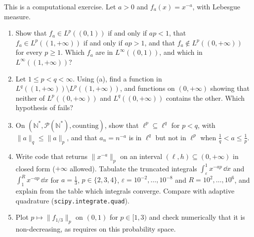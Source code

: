 \begin{exercise}\label{ex:ld-powers}
\medium This is a computational exercise. Let $a>0$ and $f_a(x)=x^{-a}$, with Lebesgue measure.
\begin{enumerate}[label=(\alph*)]
  \item Show that $f_a\in L^p((0,1))$ if and only if $ap<1$, that $f_a\in L^p((1,+\infty))$ if and
    only if $ap>1$, and that $f_a\notin L^p((0,+\infty))$ for every $p\ge1$. Which $f_a$ are in
    $L^\infty((0,1))$, and which in $L^\infty((1,+\infty))$?
  \item Let $1\le p<q<\infty$. Using (a), find a function in $L^q((1,+\infty))\setminus
    L^p((1,+\infty))$, and functions on $(0,+\infty)$ showing that neither of $L^p((0,+\infty))$ and
    $L^q((0,+\infty))$ contains the other. Which hypothesis of  fails?
  \item On $(\mathbb N^*,\mathcal P(\mathbb N^*),\text{counting})$, show that $\ell^p\subseteq\ell^q$
    for $p<q$, with $\|a\|_q\le\|a\|_p$, and that $a_n=n^{-a}$ is in $\ell^q$ but not in $\ell^p$
    when $\frac1q<a\le\frac1p$.
  \item Write code that returns $\|x^{-a}\|_p$ on an interval $(\ell,h)\subseteq(0,+\infty)$ in
    closed form ($+\infty$ allowed). Tabulate the truncated integrals $\int_\varepsilon^1x^{-ap}\,\dd x$
    and $\int_1^Rx^{-ap}\,\dd x$ for $a=\frac13$, $p\in\{2,3,4\}$, $\varepsilon=10^{-2},\dots,10^{-8}$ and
    $R=10^2,\dots,10^6$, and explain from the table which integrals converge. Compare with
    adaptive quadrature (\texttt{scipy.integrate.quad}).
  \item Plot $p\mapsto\|f_{1/3}\|_p$ on $(0,1)$ for $p\in[1,3)$ and check numerically that it is
    non-decreasing, as  requires on this probability space.
\end{enumerate}
\end{exercise}

